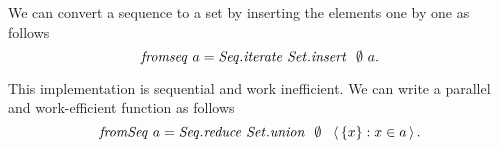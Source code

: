 \begin{example}
\label{XXex:st::fromseq-imp}
We can  convert a sequence to a set by inserting the elements
one by one as follows
\[
\mathit{fromseq}~a = \mathit{Seq.iterate}~\mathit{Set.insert}~~\emptyset~a.
\]

This implementation is sequential and work inefficient. 
%
We can write a parallel and work-efficient function as follows
\[
\mathit{fromSeq}~a = \mathit{Seq.reduce}~\mathit{Set.union}~~\emptyset~~\left\langle\, \left\{ x \right\} : x \in a \,\right\rangle.
\]

\end{example}


